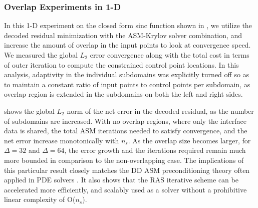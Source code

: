 \subsubsection{Overlap Experiments in 1-D}

In this 1-D experiment on the closed form sinc function shown in , we utilize the decoded residual minimization with the ASM-Krylov solver combination, and increase the amount of overlap in the input points to look at convergence speed. We measured the global $L_2$ error convergence along with the total cost in terms of outer iteration to compute the constrained control point locations. In this analysis, adaptivity in the individual subdomains was explicitly turned off so as to maintain a constant ratio of input points to control points per subdomain, as overlap region is extended in the subdomains on both the left and right sides.

 shows the global $L_2$ norm of the net error in the decoded residual, as the number of subdomains are increased. With no overlap regions, where only the interface data is shared, the total ASM iterations needed to satisfy convergence, and the net error increase monotonically with $n_s$. As the overlap size becomes larger, for $\Delta=32$ and $\Delta=64$, the error growth and the iterations required remain much more bounded in comparison to the non-overlapping case. The implications of this particular result closely matches the DD ASM preconditioning theory often applied in PDE solvers \cite{smith-ddm, lions-asm, gander-rasm}. It also shows that the RAS iterative scheme can be accelerated more efficiently, and scalably used as a solver without a prohibitive linear complexity of O($n_s$).

